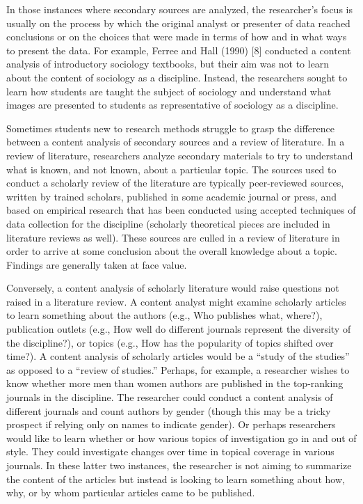 In those instances where secondary sources are analyzed, the researcher's focus is usually on the process by which the original analyst or presenter of data reached conclusions or on the choices that were made in terms of how and in what ways to present the data. For example, Ferree and Hall (1990) [8] conducted a content analysis of introductory sociology textbooks, but their aim was not to learn about the content of sociology as a discipline. Instead, the researchers sought to learn how students are taught the subject of sociology and understand what images are presented to students as representative of sociology as a discipline.

Sometimes students new to research methods struggle to grasp the difference between a content analysis of secondary sources and a review of literature. In a review of literature, researchers analyze secondary materials to try to understand what is known, and not known, about a particular topic. The sources used to conduct a scholarly review of the literature are typically peer-reviewed sources, written by trained scholars, published in some academic journal or press, and based on empirical research that has been conducted using accepted techniques of data collection for the discipline (scholarly theoretical pieces are included in literature reviews as well). These sources are culled in a review of literature in order to arrive at some conclusion about the overall knowledge about a topic. Findings are generally taken at face value.

Conversely, a content analysis of scholarly literature would raise questions not raised in a literature review. A content analyst might examine scholarly articles to learn something about the authors (e.g., Who publishes what, where?), publication outlets (e.g., How well do different journals represent the diversity of the discipline?), or topics (e.g., How has the popularity of topics shifted over time?). A content analysis of scholarly articles would be a ``study of the studies'' as opposed to a ``review of studies.'' Perhaps, for example, a researcher wishes to know whether more men than women authors are published in the top-ranking journals in the discipline. The researcher could conduct a content analysis of different journals and count authors by gender (though this may be a tricky prospect if relying only on names to indicate gender). Or perhaps researchers would like to learn whether or how various topics of investigation go in and out of style. They could investigate changes over time in topical coverage in various journals. In these latter two instances, the researcher is not aiming to summarize the content of the articles but instead is looking to learn something about how, why, or by whom particular articles came to be published.

